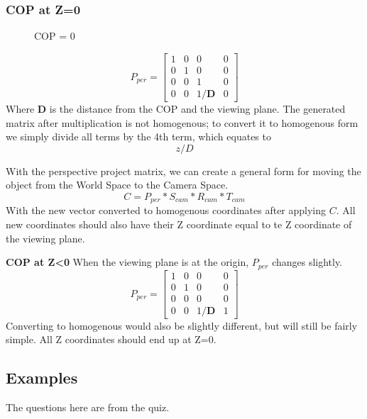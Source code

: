 \subsubsection{COP at Z=0}
\begin{figure}[!htb]
	\caption{\label{fig:trianglesZ0} COP = 0}
\end{figure}
\begin{equation}
\label{eqn:proj0}
P_{per} = \begin{bmatrix}
1 & 0 & 0 & 0\\ 
0 & 1 & 0 & 0\\ 
0 & 0 & 1 & 0\\
0 & 0 & 1/\mathbf{D} & 0 
\end{bmatrix}
\end{equation}
Where \textbf{D} is the distance from the COP and the viewing plane. The generated matrix after multiplication is not homogenous; to convert it to homogenous form we simply divide all terms by the 4th term, which equates to \[z/D\]

With the perspective project matrix, we can create a general form for moving the object from the World Space to the Camera Space.
\begin{equation}
\label{eqn:worldToCam1}
C = P_{per} * S_{cam} * R_{cam} * T_{cam}
\end{equation}
With the new vector converted to homogenous coordinates after applying $C$.
All new coordinates should also have their Z coordinate equal to te Z coordinate of the viewing plane.

\textbf{COP at Z<0}
When the viewing plane is at the origin, $P_{per}$ changes slightly.
\begin{equation}
\label{eqn:proj1}
P_{per} = \begin{bmatrix}
1 & 0 & 0 & 0\\ 
0 & 1 & 0 & 0\\ 
0 & 0 & 0 & 0\\
0 & 0 & 1/\mathbf{D} & 1 
\end{bmatrix}
\end{equation}
Converting to homogenous would also be slightly different, but will still be fairly simple.
All Z coordinates should end up at Z=0.

\subsection{Examples}

The questions here are from the quiz.

